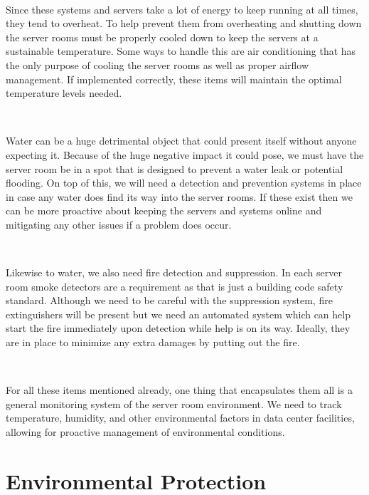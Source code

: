 \documentclass[12pt,a4paper]{report}
\begin{document}
\

Since these systems and servers take a lot of energy to keep running at all times, they tend to overheat.
To help prevent them from overheating and shutting down the server rooms must be properly cooled down to keep the servers at a sustainable temperature. 
Some ways to handle this are air conditioning that has the only purpose of cooling the server rooms as well as proper airflow management.
If implemented correctly, these items will maintain the optimal temperature levels needed.

\

Water can be a huge detrimental object that could present itself without anyone expecting it.
Because of the huge negative impact it could pose, we must have the server room be in a spot that is designed to prevent a water leak or potential flooding.
On top of this, we will need a detection and prevention systems in place in case any water does find its way into the server rooms.
If these exist then we can be more proactive about keeping the servers and systems online and mitigating any other issues if a problem does occur.

\

Likewise to water, we also need fire detection and suppression.
In each server room smoke detectors are a requirement as that is just a building code safety standard.
Although we need to be careful with the suppression system, fire extinguishers will be present but we need an automated system which can help start the fire immediately upon detection while help is on its way.
Ideally, they are in place to minimize any extra damages by putting out the fire.

\

For all these items mentioned already, one thing that encapsulates them all is a general monitoring system of the server room environment.
We need to track temperature, humidity, and other environmental factors in data center facilities, allowing for proactive management of environmental conditions.

\section{Environmental Protection}
\
\end{document}
